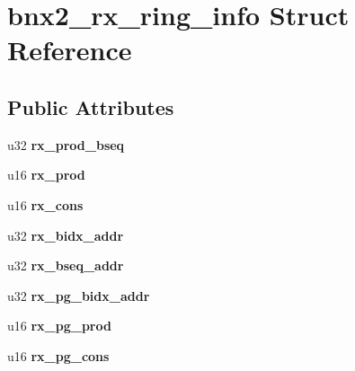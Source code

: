 \hypertarget{structbnx2__rx__ring__info}{
\section{bnx2\_\-rx\_\-ring\_\-info Struct Reference}
\label{structbnx2__rx__ring__info}
}
\subsection*{Public Attributes}
\begin{DoxyCompactItemize}
\item 
\hypertarget{structbnx2__rx__ring__info_a211497585c8204f6e0ec78a76fcdabff}{
u32 {\bfseries rx\_\-prod\_\-bseq}}
\label{structbnx2__rx__ring__info_a211497585c8204f6e0ec78a76fcdabff}

\item 
\hypertarget{structbnx2__rx__ring__info_af4d8b9c616020f664da54399a6b4f16a}{
u16 {\bfseries rx\_\-prod}}
\label{structbnx2__rx__ring__info_af4d8b9c616020f664da54399a6b4f16a}

\item 
\hypertarget{structbnx2__rx__ring__info_abff1421457bf19cfddbe2514f0bbc806}{
u16 {\bfseries rx\_\-cons}}
\label{structbnx2__rx__ring__info_abff1421457bf19cfddbe2514f0bbc806}

\item 
\hypertarget{structbnx2__rx__ring__info_aab1aff3a8cabae2d29e1133a3936268b}{
u32 {\bfseries rx\_\-bidx\_\-addr}}
\label{structbnx2__rx__ring__info_aab1aff3a8cabae2d29e1133a3936268b}

\item 
\hypertarget{structbnx2__rx__ring__info_a9f91edfee5f986a20cbe260f6c78ab88}{
u32 {\bfseries rx\_\-bseq\_\-addr}}
\label{structbnx2__rx__ring__info_a9f91edfee5f986a20cbe260f6c78ab88}

\item 
\hypertarget{structbnx2__rx__ring__info_ae6b0c57c0e2881ba6ec3a6d1227e5ae5}{
u32 {\bfseries rx\_\-pg\_\-bidx\_\-addr}}
\label{structbnx2__rx__ring__info_ae6b0c57c0e2881ba6ec3a6d1227e5ae5}

\item 
\hypertarget{structbnx2__rx__ring__info_a95d09c025a8000c9b14652afa7c83769}{
u16 {\bfseries rx\_\-pg\_\-prod}}
\label{structbnx2__rx__ring__info_a95d09c025a8000c9b14652afa7c83769}

\item 
\hypertarget{structbnx2__rx__ring__info_ae89c6f481a4f8dfe41d592bedff078b4}{
u16 {\bfseries rx\_\-pg\_\-cons}}
\label{structbnx2__rx__ring__info_ae89c6f481a4f8dfe41d592bedff078b4}


\end{DoxyCompactItemize}
